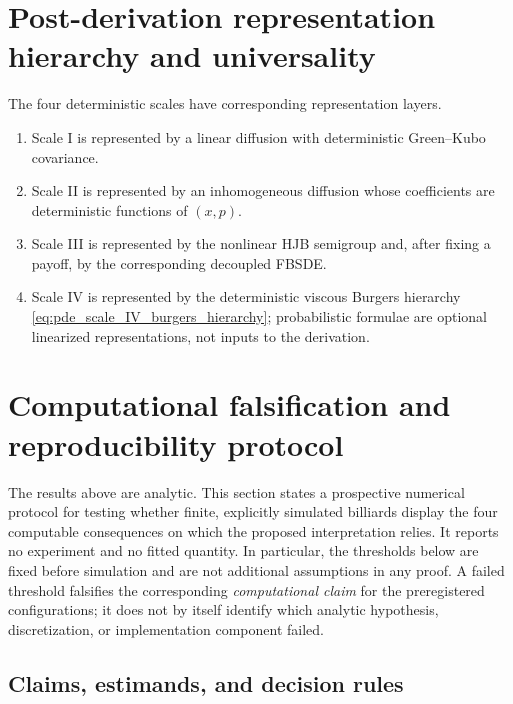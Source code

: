 \documentclass[12pt, letterpaper]{amsart}
\theoremstyle{plain}
\theoremstyle{definition}
\theoremstyle{remark}
\begin{document}
\section{Post-derivation representation hierarchy and universality}
\label{sec:prob_hierarchy_corrected}

The four deterministic scales have corresponding representation layers.
\begin{enumerate}[label=(\roman*), wide, labelindent=0pt]
    \item Scale I is represented by a linear diffusion with deterministic Green--Kubo covariance.
    \item Scale II is represented by an inhomogeneous diffusion whose coefficients are deterministic functions of $(x,p)$.
    \item Scale III is represented by the nonlinear HJB semigroup and, after fixing a payoff, by the corresponding decoupled FBSDE.
    \item Scale IV is represented by the deterministic viscous Burgers hierarchy \eqref{eq:pde_scale_IV_burgers_hierarchy}; probabilistic formulae are optional linearized representations, not inputs to the derivation.
\end{enumerate}

\section{Computational falsification and reproducibility protocol}
\label{sec:computational_falsification}

The results above are analytic.  This section states a prospective numerical
protocol for testing whether finite, explicitly simulated billiards display the
four computable consequences on which the proposed interpretation relies.  It
reports no experiment and no fitted quantity.  In particular, the thresholds
below are fixed before simulation and are not additional assumptions in any
proof.  A failed threshold falsifies the corresponding \emph{computational
claim} for the preregistered configurations; it does not by itself identify
which analytic hypothesis, discretization, or implementation component failed.

\subsection{Claims, estimands, and decision rules}
\end{document}
